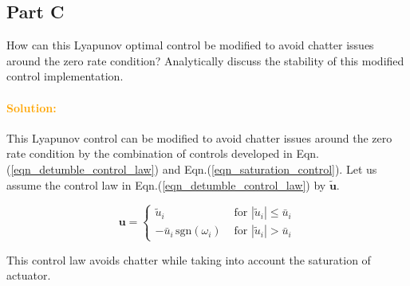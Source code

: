 \documentclass{article}
\begin{document}
\subsection*{Part C}
How can this Lyapunov optimal control be modified to avoid chatter issues around the zero rate condition?  Analytically discuss the stability of this modified control implementation.

\paragraph{\textcolor{orange}{Solution:}} This Lyapunov control can be modified to avoid chatter issues around the zero rate condition by the combination of controls developed in Eqn.(\ref{eqn_detumble_control_law}) and Eqn.(\ref{eqn_saturation_control}). Let us assume the control law in Eqn.(\ref{eqn_detumble_control_law}) by $\tilde{\bm{u}}$.

\begin{equation}
  \bm{u}= 
  \begin{cases}
    \tilde{u}_{i}&\text{ for }|\tilde{u}_{i}|\leq\bar{u}_{i}\\
    -\bar{u}_{i}\,\text{sgn}(\omega_{i})&\text{ for }|\tilde{u}_{i}|>\bar{u}_{i}
  \end{cases}
\end{equation}

This control law avoids chatter while taking into account the saturation of actuator.
\end{document}
